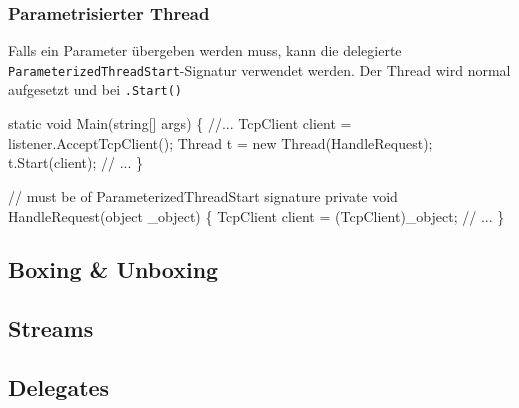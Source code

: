 \documentclass[
  9pt,
  a4paperpaper,
  DIV=11]{scrartcl}
\newenvironment{Shaded}{}{}
\newcommand{\CommentTok}[1]{\textcolor[rgb]{0.42,0.45,0.49}{#1}}
\newcommand{\DataTypeTok}[1]{\textcolor[rgb]{0.84,0.23,0.29}{#1}}
\newcommand{\FunctionTok}[1]{\textcolor[rgb]{0.44,0.26,0.76}{#1}}
\newcommand{\KeywordTok}[1]{\textcolor[rgb]{0.84,0.23,0.29}{#1}}
\newcommand{\NormalTok}[1]{\textcolor[rgb]{0.14,0.16,0.18}{#1}}
\newcommand{\OperatorTok}[1]{\textcolor[rgb]{0.14,0.16,0.18}{#1}}
\numberwithin{equation}{section}
\begin{document}
\begin{multicols}{2}
\begin{tcolorbox}
\begin{tcolorbox}
\begin{tcolorbox}
\begin{tcolorbox}
\begin{tcolorbox}
\begin{tcolorbox}
\hypertarget{parametrisierter-thread}{%
\subsubsection{Parametrisierter Thread}\label{parametrisierter-thread}}

Falls ein Parameter übergeben werden muss, kann die delegierte
\texttt{ParameterizedThreadStart}-Signatur verwendet werden. Der Thread
wird normal aufgesetzt und bei \texttt{.Start()}

\begin{Shaded}
\begin{Highlighting}[]
\KeywordTok{static} \DataTypeTok{void} \FunctionTok{Main}\OperatorTok{(}\DataTypeTok{string}\OperatorTok{[]}\NormalTok{ args}\OperatorTok{)}
\OperatorTok{\{}
  \CommentTok{//...}
\NormalTok{  TcpClient client }\OperatorTok{=}\NormalTok{ listener}\OperatorTok{.}\FunctionTok{AcceptTcpClient}\OperatorTok{();}
\NormalTok{  Thread t }\OperatorTok{=} \KeywordTok{new} \FunctionTok{Thread}\OperatorTok{(}\NormalTok{HandleRequest}\OperatorTok{);}
\NormalTok{  t}\OperatorTok{.}\FunctionTok{Start}\OperatorTok{(}\NormalTok{client}\OperatorTok{);}
  \CommentTok{// ...}
\OperatorTok{\}}

\CommentTok{// must be of ParameterizedThreadStart signature}
\KeywordTok{private} \DataTypeTok{void} \FunctionTok{HandleRequest}\OperatorTok{(}\DataTypeTok{object}\NormalTok{ \_object}\OperatorTok{)}
\OperatorTok{\{}
\NormalTok{  TcpClient client }\OperatorTok{=} \OperatorTok{(}\NormalTok{TcpClient}\OperatorTok{)}\NormalTok{\_object}\OperatorTok{;}
  \CommentTok{// ...}
\OperatorTok{\}}
\end{Highlighting}
\end{Shaded}

\hypertarget{boxing-unboxing}{%
\subsection{Boxing \& Unboxing}\label{boxing-unboxing}}

\hypertarget{streams}{%
\subsection{Streams}\label{streams}}

\hypertarget{delegates}{%
\subsection{Delegates}\label{delegates}}


\end{tcolorbox}
\end{tcolorbox}
\end{tcolorbox}
\end{tcolorbox}
\end{tcolorbox}
\end{tcolorbox}
\end{multicols}
\end{document}

